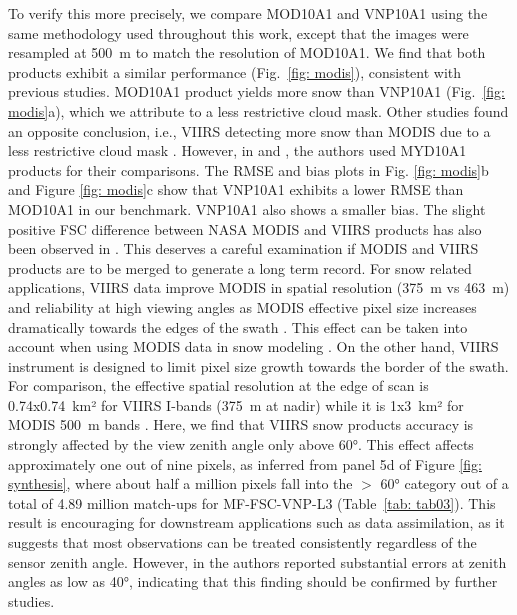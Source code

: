 \documentclass[tc, manuscript]{copernicus}
\begin{document}
To verify this more precisely, we compare MOD10A1 and VNP10A1 using the same methodology used throughout this work, except that the images were resampled at 500~m to match the resolution of MOD10A1. We find that both products exhibit a similar performance (Fig.~\ref{fig: modis}), consistent with previous studies. MOD10A1 product yields more snow than VNP10A1 (Fig.~\ref{fig: modis}a), which we attribute to a less restrictive cloud mask. Other studies found an opposite conclusion, i.e., VIIRS detecting more snow than MODIS due to a less restrictive cloud mask \citep{thapa_cross-comparison_2019,liu2022EffectCloudMask, hall_comparison_2024}. However, in  \citep{thapa_cross-comparison_2019} and \citep{liu2022EffectCloudMask}, the authors used MYD10A1 products for their comparisons. The RMSE and bias plots in Fig. \ref{fig: modis}b and Figure \ref{fig: modis}c show that VNP10A1 exhibits a lower RMSE than MOD10A1 in our benchmark. VNP10A1 also shows a smaller bias. The slight positive FSC difference between NASA MODIS and VIIRS products has also been observed in \citep{jacques-hamilton_measurement_2025,stillinger_landsat_2023, liu_consistency_2024}. This deserves a careful examination if MODIS and VIIRS products are to be merged to generate a long term record. For snow related applications, VIIRS data improve MODIS in spatial resolution (375~m vs 463~m) and reliability at high viewing angles as MODIS effective pixel size increases dramatically towards the edges of the swath \citep{dozier2008TimeSpaceContinuity}. This effect can be taken into account when using MODIS data in snow modeling \citep{sun_evaluation_2024}. On the other hand, VIIRS instrument is designed to limit pixel size growth towards the border of the swath. For comparison, the effective spatial resolution at the edge of scan is 0.74x0.74~km² for VIIRS I-bands (375~m at nadir) while it is 1x3~km² for MODIS 500~m bands \citep{schueler_viirs_2013}. Here, we find that VIIRS snow products accuracy is strongly affected by the view zenith angle only above 60°. This effect affects approximately one out of nine pixels, as inferred from panel 5d of Figure \ref{fig: synthesis}, where about half a million pixels fall into the $>$ 60° category out of a total of 4.89 million match-ups for  MF-FSC-VNP-L3 (Table~\ref{tab: tab03}). This result is encouraging for downstream applications such as data assimilation, as it suggests that most observations can be treated consistently regardless of the sensor zenith angle. However, in \citep{stillinger_landsat_2023} the authors reported substantial errors at zenith angles as low as 40°, indicating that this finding should be confirmed by further studies.
\end{document}
